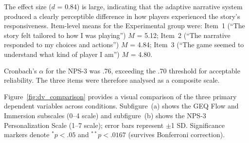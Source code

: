 The effect size ($d$ = 0.84) is large, indicating that the adaptive narrative system produced a clearly perceptible difference in how players experienced the story's responsiveness. Item-level means for the Experimental group were: Item~1 (``The story felt tailored to how I was playing'') $M$ = 5.12; Item~2 (``The narrative responded to my choices and actions'') $M$ = 4.84; Item~3 (``The game seemed to understand what kind of player I am'') $M$ = 4.80.

Cronbach's $\alpha$ for the NPS-3 was .76, exceeding the .70 threshold for acceptable reliability. The three items were therefore analysed as a composite scale.

Figure~\ref{fig:dv_comparison} provides a visual comparison of the three primary dependent variables across conditions. Subfigure~(a) shows the GEQ Flow and Immersion subscales (0--4 scale) and subfigure~(b) shows the NPS-3 Personalization Scale (1--7 scale); error bars represent $\pm$1 SD. Significance markers denote $^{*}p < .05$ and $^{**}p < .0167$ (survives Bonferroni correction).


